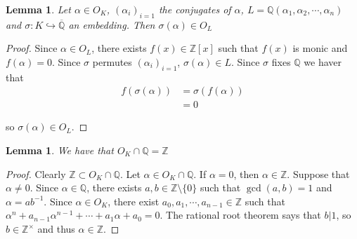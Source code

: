\documentclass[12pt]{amsart}
\newtheorem{lem}[thm]{Lemma}
\newcommand{\al}{\alpha}
\newcommand{\sig}{\sigma}
\newcommand{\Z}{\mathbb{Z}}
\newcommand{\Q}{\mathbb{Q}}
\begin{document}
\begin{lem}
Let $\al \in O_K$, $(\al_i)_{i=1}$ the conjugates of $\al$, $L = \Q(\al_1, \al_2, \cdots, \al_n)$ and $\sig: K \hookrightarrow \overline{\Q}$ an embedding. Then $\sig(\al) \in O_L$
\end{lem}

\begin{proof}
Since $\al \in O_L$, there exists $f(x) \in \Z[x]$ such that $f(x)$ is monic and $f(\al)=0$. Since $\sig$ permutes $(\al_i)_{i=1}$, $\sig(\al) \in L$. Since $\sig$ fixes $\Q$ we haver that
\begin{align*}
f(\sig(\al)) 
&= \sig(f(\al))\\
&=0
\end{align*}

so $\sig(\al) \in O_L$.
\end{proof}

\begin{lem}
We have that $O_K \cap \Q = \Z$
\end{lem}

\begin{proof}
Clearly $\Z \subset O_K \cap \Q$. Let $\al \in O_K \cap \Q$. If $\al=0$, then $\al \in \Z$. Suppose that $\al \neq 0$. Since $\al \in \Q$, there exists $a,b \in \Z\setminus\{0\}$ such that $\gcd(a,b) =1$ and $\al = ab^{-1}$. Since $\al \in O_K$, there exist $a_0, a_1, \cdots, a_{n-1} \in \Z$ such that $\al^n + a_{n-1}\al^{n-1} + \cdots + a_1\al + a_0=0$. The rational root theorem says that $b|1$, so $b\in \Z^{\times}$ and thus $\al \in \Z$.
\end{proof}
\end{document}
